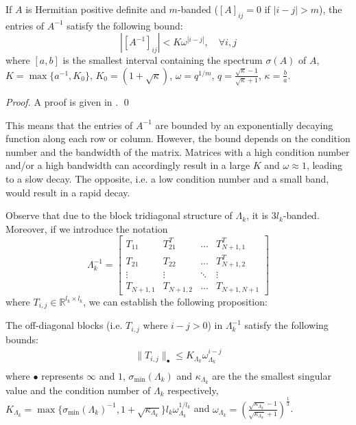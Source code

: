 \begin{lemma} \label{l:decay}
If $A$ is Hermitian positive definite and $m$-banded ($[A]_{ij} = 0$ if $|i-j| > m$), the entries of $A^{-1}$ satisfy the following bound:
\begin{equation}
|[A^{-1}]_{ij}| < K\omega^{|i-j|}, \quad \forall i,j
\end{equation}
where $[a,b]$ is the smallest interval containing the spectrum $\sigma(A)$ of $A$, $K = \max \{ a^{-1}, K_0 \}$, $K_0 = (1 + \sqrt{\kappa})$, $\omega = q^{1/m}$, $q = \frac{\sqrt{\kappa} - 1}{\sqrt{\kappa} + 1}$, $\kappa = \frac{b}{a}$.
\end{lemma}
\begin{proof}
A proof is given in \cite{}. \qed
\end{proof}

This means that the entries of $A^{-1}$ are bounded by an exponentially decaying function along each row or column. However, the bound depends on the condition number and the bandwidth of the matrix. Matrices with a high condition number and/or a high bandwidth can accordingly result in a large $K$ and $\omega \approx 1$, leading to a slow decay. The opposite, i.e. a low condition number and a small band, would result in a rapid decay.

Observe that due to the block tridiagonal structure of $\Lambda_k$, it is $3 l_k$-banded. Moreover, if we introduce the notation
\begin{equation}
\Lambda_k^{-1} = \left[ \begin{array}{cccc}
T_{11} & T_{21}^T & \hdots & T_{N+1,1}^T \\
T_{21} & T_{22} & \hdots & T_{N+1,2}^T \\
\vdots & \vdots  & \ddots & \vdots \\
T_{N+1,1} & T_{N+1,2} & \hdots & T_{N+1,N+1}
\end{array} \right]
\end{equation}
where $T_{i,j} \in \mathbb{R}^{l_{k} \times l_{k}}$, we can establish the following proposition:

\begin{proposition} \label{p:decayofLambda}
The off-diagonal blocks (i.e. $T_{i,j}$ where $i - j > 0$) in $\Lambda_k^{-1}$ satisfy the following bounds:
\begin{subequations} \label{e:decayofLambda}
\begin{align}
\| T_{i,j} \|_\bullet \leq K_{\Lambda_k} \omega_{\Lambda_k}^{i - j} \\
\end{align}
\end{subequations}
where $\bullet$ represents $\infty$ and $1$, $\sigma_{\min}(\Lambda_k)$ and $\kappa_{\Lambda_k}$ are the the smallest singular value and the condition number of $\Lambda_k$ respectively, $K_{\Lambda_k} = \max \{ \sigma_{\min}(\Lambda_k)^{-1}, 1 + \sqrt{\kappa_{\Lambda_k}} \} l_k \omega_{\Lambda_k}^{1/l_k}$ and $\omega_{\Lambda_k} = \left( \frac{\sqrt{\kappa_{\Lambda_k}} - 1}{\sqrt{\kappa_{\Lambda_k}} + 1} \right)^{\frac{1}{3}}$.
\end{proposition}

